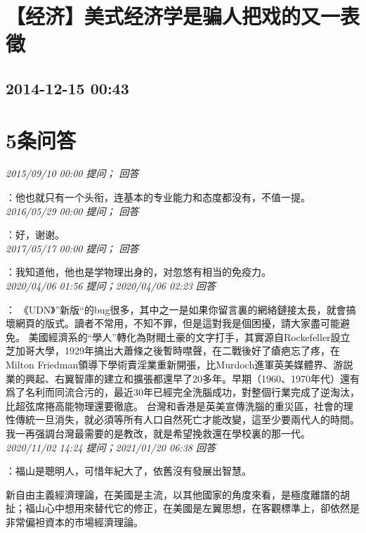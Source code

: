 \documentclass[twocolumn]{ctexart}
\begin{document}
\section{【经济】美式经济学是骗人把戏的又一表徵}
\subsection{2014-12-15 00:43}


\section{5条问答}

\textit{\hfill\noindent\small 2015/09/10 00:00 提问； 回答}

：他也就只有一个头衔，连基本的专业能力和态度都没有，不值一提。\\

\textit{\hfill\noindent\small 2016/05/29 00:00 提问； 回答}

：好，谢谢。\\

\textit{\hfill\noindent\small 2017/05/17 00:00 提问； 回答}

：我知道他，他也是学物理出身的，对忽悠有相当的免疫力。\\

\textit{\hfill\noindent\small 2020/04/06 01:56 提问；2020/04/06 02:23 回答}

：
《UDN》”新版“的bug很多，其中之一是如果你留言裏的網絡鏈接太長，就會搞壞網頁的版式。讀者不常用，不知不罪，但是這對我是個困擾，請大家盡可能避免。 
美國經濟系的“學人”轉化為財閥土豪的文字打手，其實源自Rockefeller設立芝加哥大學，1929年搞出大蕭條之後暫時噤聲，在二戰後好了瘡疤忘了疼，在Milton Friedman領導下學術賣淫業重新開張，比Murdoch進軍英美媒體界、游説業的興起、右翼智庫的建立和擴張都還早了20多年。早期（1960、1970年代）還有爲了名利而同流合污的，最近30年已經完全洗腦成功，對整個行業完成了逆淘汰，比超弦席捲高能物理還要徹底。 
台灣和香港是英美宣傳洗腦的重災區，社會的理性傳統一旦消失，就必須等所有人口自然死亡才能改變，這至少要兩代人的時間。我一再强調台灣最需要的是教改，就是希望挽救還在學校裏的那一代。
\\

\textit{\hfill\noindent\small 2020/11/02 14:24 提问；2021/01/20 06:38 回答}

：福山是聰明人，可惜年紀大了，依舊沒有發展出智慧。

新自由主義經濟理論，在美國是主流，以其他國家的角度來看，是極度離譜的胡扯；福山心中想用來替代它的修正，在美國是左翼思想，在客觀標準上，卻依然是非常偏袒資本的市場經濟理論。
\\
\end{document}
